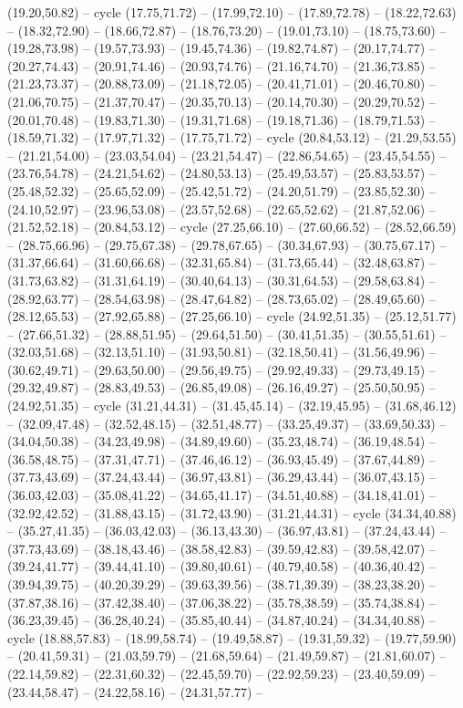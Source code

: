 {(19.20,50.82) -- cycle (17.75,71.72) -- (17.99,72.10) -- (17.89,72.78) -- (18.22,72.63) -- (18.32,72.90) -- (18.66,72.87) -- (18.76,73.20) -- (19.01,73.10) -- (18.75,73.60) -- (19.28,73.98) -- (19.57,73.93) -- (19.45,74.36) -- (19.82,74.87) -- (20.17,74.77) -- (20.27,74.43) -- (20.91,74.46) -- (20.93,74.76) -- (21.16,74.70) -- (21.36,73.85) -- (21.23,73.37) -- (20.88,73.09) -- (21.18,72.05) -- (20.41,71.01) -- (20.46,70.80) -- (21.06,70.75) -- (21.37,70.47) -- (20.35,70.13) -- (20.14,70.30) -- (20.29,70.52) -- (20.01,70.48) -- (19.83,71.30) -- (19.31,71.68) -- (19.18,71.36) -- (18.79,71.53) -- (18.59,71.32) -- (17.97,71.32) -- (17.75,71.72) -- cycle (20.84,53.12) -- (21.29,53.55) -- (21.21,54.00) -- (23.03,54.04) -- (23.21,54.47) -- (22.86,54.65) -- (23.45,54.55) -- (23.76,54.78) -- (24.21,54.62) -- (24.80,53.13) -- (25.49,53.57) -- (25.83,53.57) -- (25.48,52.32) -- (25.65,52.09) -- (25.42,51.72) -- (24.20,51.79) -- (23.85,52.30) -- (24.10,52.97) -- (23.96,53.08) -- (23.57,52.68) -- (22.65,52.62) -- (21.87,52.06) -- (21.52,52.18) -- (20.84,53.12) -- cycle (27.25,66.10) -- (27.60,66.52) -- (28.52,66.59) -- (28.75,66.96) -- (29.75,67.38) -- (29.78,67.65) -- (30.34,67.93) -- (30.75,67.17) -- (31.37,66.64) -- (31.60,66.68) -- (32.31,65.84) -- (31.73,65.44) -- (32.48,63.87) -- (31.73,63.82) -- (31.31,64.19) -- (30.40,64.13) -- (30.31,64.53) -- (29.58,63.84) -- (28.92,63.77) -- (28.54,63.98) -- (28.47,64.82) -- (28.73,65.02) -- (28.49,65.60) -- (28.12,65.53) -- (27.92,65.88) -- (27.25,66.10) -- cycle (24.92,51.35) -- (25.12,51.77) -- (27.66,51.32) -- (28.88,51.95) -- (29.64,51.50) -- (30.41,51.35) -- (30.55,51.61) -- (32.03,51.68) -- (32.13,51.10) -- (31.93,50.81) -- (32.18,50.41) -- (31.56,49.96) -- (30.62,49.71) -- (29.63,50.00) -- (29.56,49.75) -- (29.92,49.33) -- (29.73,49.15) -- (29.32,49.87) -- (28.83,49.53) -- (26.85,49.08) -- (26.16,49.27) -- (25.50,50.95) -- (24.92,51.35) -- cycle (31.21,44.31) -- (31.45,45.14) -- (32.19,45.95) -- (31.68,46.12) -- (32.09,47.48) -- (32.52,48.15) -- (32.51,48.77) -- (33.25,49.37) -- (33.69,50.33) -- (34.04,50.38) -- (34.23,49.98) -- (34.89,49.60) -- (35.23,48.74) -- (36.19,48.54) -- (36.58,48.75) -- (37.31,47.71) -- (37.46,46.12) -- (36.93,45.49) -- (37.67,44.89) -- (37.73,43.69) -- (37.24,43.44) -- (36.97,43.81) -- (36.29,43.44) -- (36.07,43.15) -- (36.03,42.03) -- (35.08,41.22) -- (34.65,41.17) -- (34.51,40.88) -- (34.18,41.01) -- (32.92,42.52) -- (31.88,43.15) -- (31.72,43.90) -- (31.21,44.31) -- cycle (34.34,40.88) -- (35.27,41.35) -- (36.03,42.03) -- (36.13,43.30) -- (36.97,43.81) -- (37.24,43.44) -- (37.73,43.69) -- (38.18,43.46) -- (38.58,42.83) -- (39.59,42.83) -- (39.58,42.07) -- (39.24,41.77) -- (39.44,41.10) -- (39.80,40.61) -- (40.79,40.58) -- (40.36,40.42) -- (39.94,39.75) -- (40.20,39.29) -- (39.63,39.56) -- (38.71,39.39) -- (38.23,38.20) -- (37.87,38.16) -- (37.42,38.40) -- (37.06,38.22) -- (35.78,38.59) -- (35.74,38.84) -- (36.23,39.45) -- (36.28,40.24) -- (35.85,40.44) -- (34.87,40.24) -- (34.34,40.88) -- cycle (18.88,57.83) -- (18.99,58.74) -- (19.49,58.87) -- (19.31,59.32) -- (19.77,59.90) -- (20.41,59.31) -- (21.03,59.79) -- (21.68,59.64) -- (21.49,59.87) -- (21.81,60.07) -- (22.14,59.82) -- (22.31,60.32) -- (22.45,59.70) -- (22.92,59.23) -- (23.40,59.09) -- (23.44,58.47) -- (24.22,58.16) -- (24.31,57.77) -- }
